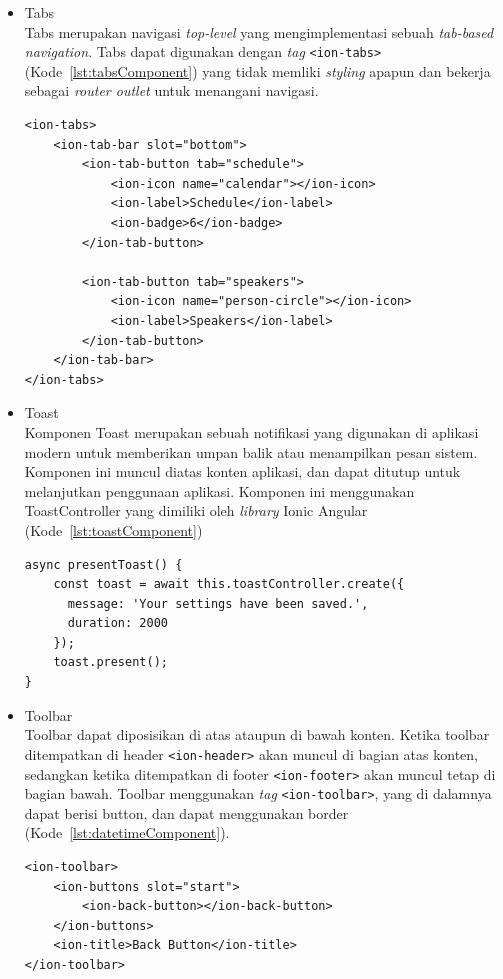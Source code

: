 \begin{itemize}
	\item Tabs \\
	Tabs merupakan navigasi {\it top-level} yang mengimplementasi sebuah {\it tab-based navigation}. Tabs dapat digunakan dengan {\it tag} \texttt{<ion-tabs>} (Kode~\ref{lst:tabsComponent}) yang tidak memliki {\it styling} apapun dan bekerja sebagai {\it router outlet} untuk menangani navigasi. 
\begin{lstlisting}[label={lst:tabsComponent}, caption=Kode Program dari Tabs]
<ion-tabs>
	<ion-tab-bar slot="bottom">
		<ion-tab-button tab="schedule">
			<ion-icon name="calendar"></ion-icon>
			<ion-label>Schedule</ion-label>
			<ion-badge>6</ion-badge>
		</ion-tab-button>

		<ion-tab-button tab="speakers">
			<ion-icon name="person-circle"></ion-icon>
			<ion-label>Speakers</ion-label>
		</ion-tab-button>
	</ion-tab-bar>
</ion-tabs>
\end{lstlisting}
		
	\item Toast \\
	Komponen Toast merupakan sebuah notifikasi yang digunakan di aplikasi modern untuk memberikan umpan balik atau menampilkan pesan sistem. Komponen ini muncul diatas konten aplikasi, dan dapat ditutup untuk melanjutkan penggunaan aplikasi. Komponen ini menggunakan ToastController yang dimiliki oleh \textit{library} Ionic Angular (Kode~\ref{lst:toastComponent}) 

\begin{lstlisting}[label={lst:toastComponent}, caption=Kode Program dari Toast]
async presentToast() {
    const toast = await this.toastController.create({
      message: 'Your settings have been saved.',
      duration: 2000
    });
    toast.present();
}
\end{lstlisting}
		

	\item Toolbar \\
	Toolbar dapat diposisikan di atas ataupun di bawah konten. Ketika toolbar ditempatkan di header \texttt{<ion-header>} akan muncul di bagian atas konten, sedangkan ketika ditempatkan di footer \texttt{<ion-footer>} akan muncul tetap di bagian bawah. Toolbar menggunakan {\it tag} \texttt{<ion-toolbar>}, yang di dalamnya dapat berisi button, dan dapat menggunakan border (Kode~\ref{lst:datetimeComponent}).

\begin{lstlisting}[label={lst:datetimeComponent}, caption=Kode Program dari Toolbar dengan Button di Dalamnya]
<ion-toolbar>
	<ion-buttons slot="start">
		<ion-back-button></ion-back-button>
	</ion-buttons>
	<ion-title>Back Button</ion-title>
</ion-toolbar>
\end{lstlisting} 
\end{itemize}
